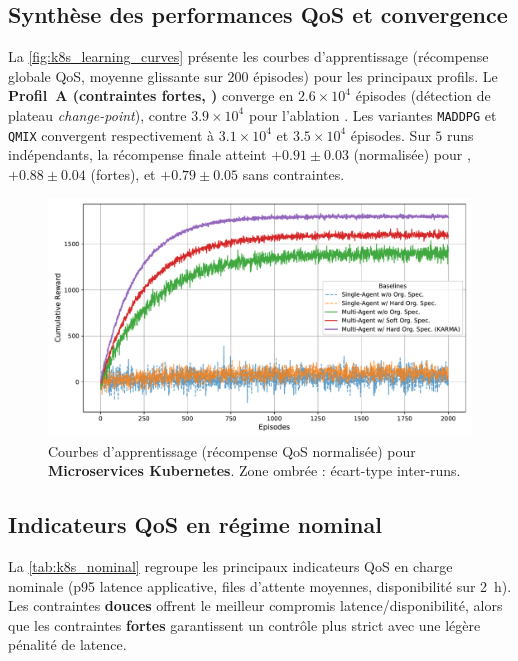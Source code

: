 \subsection*{Synthèse des performances QoS et convergence}

La \autoref{fig:k8s_learning_curves} présente les courbes d’apprentissage (récompense globale QoS, moyenne glissante sur $200$ épisodes) pour les principaux profils.
Le \textbf{Profil~A (contraintes fortes, )} converge en $2.6\times 10^4$ épisodes (détection de plateau \emph{change-point}), contre $3.9\times 10^4$ pour l’ablation \texttt{}.
Les variantes \texttt{MADDPG} et \texttt{QMIX} convergent respectivement à $3.1\times 10^4$ et $3.5\times 10^4$ épisodes.
Sur $5$ runs indépendants, la récompense finale atteint $+0.91 \pm 0.03$ (normalisée) pour , $+0.88 \pm 0.04$ (fortes), et $+0.79 \pm 0.05$ sans contraintes.

\begin{figure}[h!]
  \centering
  \includegraphics[width=0.75\linewidth]{figures/results_k8s_learning.pdf}
  \caption[Courbes d’apprentissage (récompense QoS normalisée) pour \textbf{Microservices Kubernetes}]{Courbes d’apprentissage (récompense QoS normalisée) pour \textbf{Microservices Kubernetes}. Zone ombrée : écart-type inter-runs.}
  \label{fig:k8s_learning_curves}
\end{figure}

\subsection*{Indicateurs QoS en régime nominal}

La \autoref{tab:k8s_nominal} regroupe les principaux indicateurs QoS en charge nominale (p95 latence applicative, files d’attente moyennes, disponibilité sur 2~h).
Les contraintes \textbf{douces} offrent le meilleur compromis latence/disponibilité, alors que les contraintes \textbf{fortes} garantissent un contrôle plus strict avec une légère pénalité de latence.

